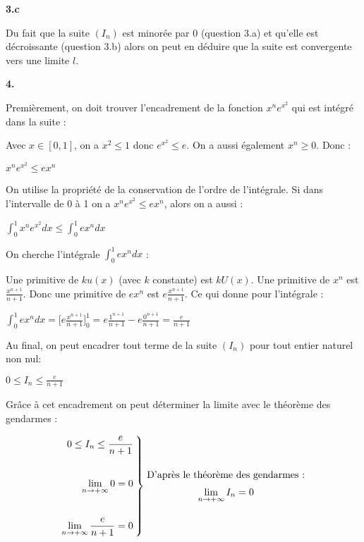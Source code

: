 \documentclass{article}
\newcommand{\vspacem}{\vspace{2mm}}
\newcommand{\bfrac}[2]{\displaystyle\frac{#1}{#2}}
\begin{document}
\vspacem
\textbf{3.c}
\vspacem

\noindent Du fait que la suite $(I_n)$ est minorée par 0 (question 3.a) et qu'elle est décroissante (question 3.b) alors on peut en déduire que la suite est convergente vers une limite $l$.

\vspacem
\textbf{4.}
\vspacem

\noindent Premièrement, on doit trouver l'encadrement de la fonction $x^n e^{x^2}$ qui est intégré dans la suite : 

\noindent Avec $x \in [0, 1]$, on a $x^2 \leq 1$ donc $e^{x^2} \leq e$. On a aussi également $x^n \geq 0$. Donc :

$x^n e^{x^2} \leq ex^n$

\noindent On utilise la propriété de la conservation de l'ordre de l'intégrale. Si dans l'intervalle de 0 à 1 on a $x^n e^{x^2} \leq ex^n$, alors on a aussi :

$\displaystyle\int^1_0 x^n e^{x^2} dx \leq \displaystyle\int^1_0 e x^n dx$

\noindent On cherche l'intégrale $\int^1_0 e x^n dx$ :

\noindent Une primitive de $k u(x)$ (avec $k$ constante) est $kU(x)$. Une primitive de $x^n$ est $\bfrac{x^{n+1}}{n+1}$. Donc une primitive de $e x^n$ est $e \bfrac{x^{n+1}}{n+1}$. Ce qui donne pour l'intégrale :

$\displaystyle\int^1_0 e x^n dx = \Bigg[ e \bfrac{x^{n+1}}{n+1} \Bigg]^1_0 = e\bfrac{1^{n+1}}{n+1} - e\bfrac{0^{n+1}}{n+1} = \bfrac{e}{n+1}$

\noindent Au final, on peut encadrer tout terme de la suite $(I_n)$ pour tout entier naturel non nul:

$0 \leq I_n \leq \bfrac{e}{n+1}$

\noindent Grâce à cet encadrement on peut déterminer la limite avec le théorème des gendarmes :

\[
    \left.\begin{matrix*}[r]
       0 \leq I_n \leq \bfrac{e}{n+1}\\
       \\
       \\
       \displaystyle\lim_{n \to + \infty} 0 = 0\\
       \\
       \\
       \displaystyle\lim_{n \to + \infty} \bfrac{e}{n+1} = 0
    \end{matrix*}\medspace\right\}
    \left.\begin{matrix*}
        \space\text{D'après le théorème des gendarmes :}\vspace{2mm}\\
        \displaystyle\lim_{n\rightarrow+\infty} I_n = 0
    \end{matrix*}\right.
\]
\end{document}
